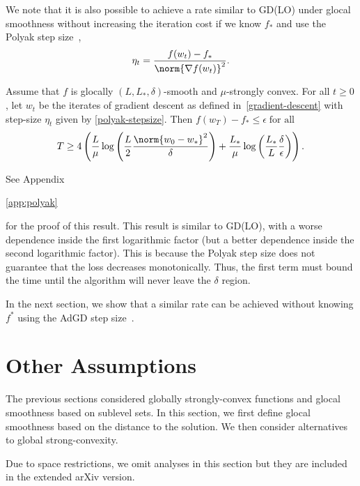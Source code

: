 \documentclass[10pt]{article} %
\newif\ifextended
\begin{document}
We note that it is also possible to achieve a rate similar to GD(LO) under glocal smoothness without increasing the iteration cost if we know $f_*$ and use the Polyak step size~\cite{polyak1987introduction},
\begin{equation}
\label{polyak-stepsize}
    \eta_t = \frac{f(w_t) - f_*}{\norm{\nabla f(w_t)}^2}.
\end{equation}
\begin{theorem}
    \label{polyak-theorem}
    Assume that $f$ is glocally $(L, L_*, \delta)$-smooth and $\mu$-strongly convex. For all $t \geq 0$, let $w_t$ be the iterates of gradient descent as defined in~\eqref{gradient-descent} with step-size $\eta_t$ given by \eqref{polyak-stepsize}. Then $f(w_T) - f_* \leq \epsilon \;\text{for all}$
    \begin{equation*}        
         T \geq 
         4\left(\frac{L}{\mu}\log\left(\frac{L}{2}\frac{\norm{w_0 - w_*}^2}{\delta}\right) + \frac{L_*}{\mu}\log\left(\frac{L_{*}}{L}\frac{\delta}{\epsilon}\right)\right).      
    \end{equation*}
\end{theorem}
See Appendix
\ifextended
\ref{polyak-proofs-function-values}
\else
\ref{app:polyak}
\fi
for the proof of this result. This result is similar to GD(LO), with a worse dependence inside the first logarithmic factor (but a better dependence inside the second logarithmic factor). This is because the Polyak step size does not guarantee that the loss decreases monotonically. Thus, the first term must bound the time until the algorithm will never leave the $\delta$ region.
\ifextended
We give a simple example where the Polyak step size increases the function in Appendix~\ref{polyak-increase-function}.
\fi 
In the next section, we show that a similar rate can be achieved without knowing $f^*$ using the AdGD step size~\cite{MalitskyM20}.


\section{Other Assumptions}\label{Other-assumptions}

The previous sections considered globally strongly-convex functions and glocal smoothness based on sublevel sets. In this section, we first define glocal smoothness based on the distance to the solution. We then consider alternatives to global strong-convexity.
\ifextended

\else
Due to space restrictions, we omit analyses in this section but they are included in the extended arXiv version.
\fi
\end{document}
